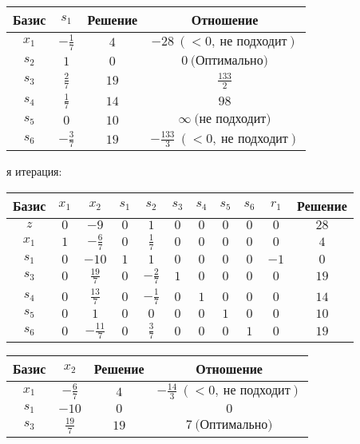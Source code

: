\documentclass{article}%
\begin{document}
\begin{flushleft}
\begin{tabular}{|cccc|}%
\hline%
Базис&$s_{1}$&Решение&Отношение\\%
\hline%
$x_{1}$&$-\frac{1}{7}$&$4$&$-28\: (< 0, \: \text{не подходит})$\\%
$s_{2}$&$1$&$0$&$0\: \text{(Оптимально)}$\\%
$s_{3}$&$\frac{2}{7}$&$19$&$\frac{133}{2}$\\%
$s_{4}$&$\frac{1}{7}$&$14$&$98$\\%
$s_{5}$&$0$&$10$&$\infty \: \text{(не подходит)}$\\%
$s_{6}$&$-\frac{3}{7}$&$19$&$-\frac{133}{3}\: (< 0, \: \text{не подходит})$\\%
\hline%
\end{tabular}%
\newline%
\newline%
я итерация: %
\newline%
\newline%
\renewcommand{\arraystretch}{1.3}%
\begin{tabular}{|c|ccccccccc|c|}%
\hline%
Базис&$x_{1}$&$x_{2}$&$s_{1}$&$s_{2}$&$s_{3}$&$s_{4}$&$s_{5}$&$s_{6}$&$r_{1}$&Решение\\%
\hline%
$z$&$0$&$-9$&$0$&$1$&$0$&$0$&$0$&$0$&$0$&$28$\\%
\hline%
$x_{1}$&$1$&$-\frac{6}{7}$&$0$&$\frac{1}{7}$&$0$&$0$&$0$&$0$&$0$&$4$\\%
$s_{1}$&$0$&$-10$&$1$&$1$&$0$&$0$&$0$&$0$&$-1$&$0$\\%
$s_{3}$&$0$&$\frac{19}{7}$&$0$&$-\frac{2}{7}$&$1$&$0$&$0$&$0$&$0$&$19$\\%
$s_{4}$&$0$&$\frac{13}{7}$&$0$&$-\frac{1}{7}$&$0$&$1$&$0$&$0$&$0$&$14$\\%
$s_{5}$&$0$&$1$&$0$&$0$&$0$&$0$&$1$&$0$&$0$&$10$\\%
$s_{6}$&$0$&$-\frac{11}{7}$&$0$&$\frac{3}{7}$&$0$&$0$&$0$&$1$&$0$&$19$\\%
\hline%
\end{tabular}%
\newline%
\newline%
\newline%
\begin{tabular}{|cccc|}%
\hline%
Базис&$x_{2}$&Решение&Отношение\\%
\hline%
$x_{1}$&$-\frac{6}{7}$&$4$&$-\frac{14}{3}\: (< 0, \: \text{не подходит})$\\%
$s_{1}$&$-10$&$0$&$0$\\%
$s_{3}$&$\frac{19}{7}$&$19$&$7\: \text{(Оптимально)}$\\%

\end{tabular}
\end{flushleft}
\end{document}
